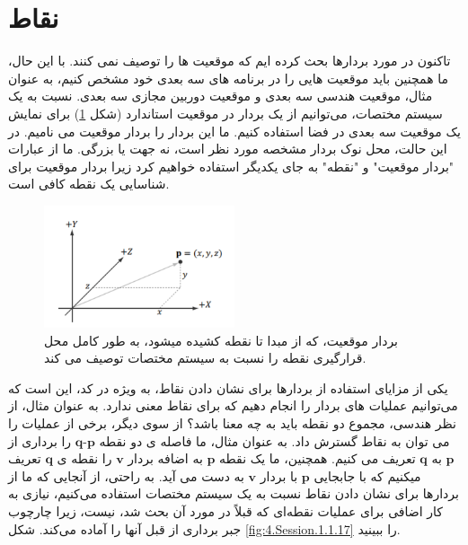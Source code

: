 \section{\textbf{نقاط}}
\label{sec:5}
{
    \Large
    \begin{spacing}{1.5}
        تاکنون در مورد بردارها بحث کرده ایم که موقعیت ها را توصیف نمی کنند.
        با این حال، ما همچنین باید موقعیت هایی را در برنامه های سه بعدی خود مشخص کنیم،
        به عنوان مثال، موقعیت هندسی سه بعدی و موقعیت دوربین مجازی سه بعدی.
        نسبت به یک سیستم مختصات، می‌توانیم از یک بردار در موقعیت استاندارد (شکل \ref{fig:4.Session.1.1.16}) برای نمایش یک موقعیت سه بعدی در فضا استفاده کنیم.
        ما این بردار را بردار موقعیت می نامیم.
        در این حالت، محل نوک بردار مشخصه مورد نظر است، نه جهت یا بزرگی.
        ما از عبارات "بردار موقعیت" و "نقطه" به جای یکدیگر استفاده خواهیم کرد زیرا بردار موقعیت برای شناسایی یک نقطه کافی است.

        \begin{figure}[H]
            \centering
            \setlength{\belowcaptionskip}{-10pt}
            \includegraphics[width=0.5\textwidth]{Images/4/4.Session.1.1.16}
            \caption {بردار موقعیت، که از مبدا تا نقطه کشیده میشود، به طور کامل محل قرارگیری نقطه را نسبت به سیستم مختصات توصیف می کند.}
            \label{fig:4.Session.1.1.16}
        \end{figure}

        یکی از مزایای استفاده از بردارها برای نشان دادن نقاط، به ویژه در کد، این است که می‌توانیم عملیات های بردار را انجام دهیم که برای نقاط معنی ندارد.
        به عنوان مثال، از نظر هندسی، مجموع دو نقطه باید به چه معنا باشد؟
        از سوی دیگر، برخی از عملیات را می توان به نقاط گسترش داد.
        به عنوان مثال، ما فاصله ی دو نقطه $\textbf{q}\textbf{-p}$ را برداری از $\textbf{p}$ به $\textbf{q}$ تعریف می کنیم. همچنین، ما یک نقطه $\textbf{p}$ به اضافه بردار $\textbf{v}$ را نقطه ی $\textbf{q}$ تعریف میکنیم که با جابجایی $\textbf{p}$ با بردار $\textbf{v}$ به دست می آید.
        به راحتی، از آنجایی که ما از بردارها برای نشان دادن نقاط نسبت به یک سیستم مختصات استفاده می‌کنیم، نیازی به کار اضافی برای عملیات نقطه‌ای که قبلاً در مورد آن بحث شد، نیست، زیرا چارچوب جبر برداری از قبل آنها را آماده می‌کند. شکل \ref{fig:4.Session.1.1.17} را ببینید.


\end{spacing}}

